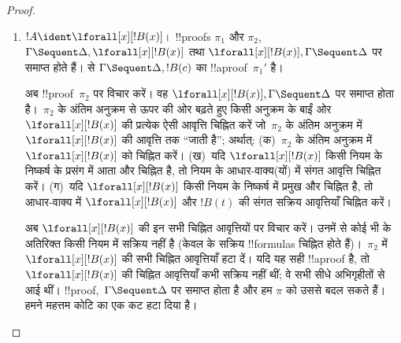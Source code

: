 \documentclass[../../../include/open-logic-section]{subfiles}
\begin{document}
\begin{proof}
\begin{enumerate}
  $\pi_2''$ पर  लगाकर $!C, !B, \Gamma
  \Sequent \Delta$ का !!a{proof}~$\pi_2'''$ भी मिलता है। !!{proof}~$\pi'$ है:
  \[
  \AxiomC{}
  \RightLabel{$\pi_2'$}
  \Deduce$\Gamma \fCenter \Delta, !B$
  \AxiomC{}
  \RightLabel{$\pi_1'$}
  \Deduce$!B, \Gamma \fCenter \Delta, !C$
  \AxiomC{}
  \RightLabel{$\pi_2'''$}
  \Deduce$!C, !B, \Gamma \fCenter \Delta$
  \RightLabel{\CutCS}
  \BinaryInf$!B, \Gamma \fCenter \Delta$
  \RightLabel{\CutCS}
  \BinaryInf$\Gamma \fCenter \Delta$
  \DisplayProof
  \]
  \item $!A \ident \lforall[x][!B(x)]$। !!{proof}s $\pi_1$ और $\pi_2$,
  $\Gamma \Sequent \Delta, \lforall[x][!B(x)]$ तथा $\lforall[x][!B(x)],
  \Gamma \Sequent \Delta$ पर समाप्त होते हैं।  से
  $\Gamma \Sequent \Delta, !B(c)$ का !!a{proof}~$\pi_1'$ है।

  अब !!{proof}~$\pi_2$ पर विचार करें। वह $\lforall[x][!B(x)], \Gamma
  \Sequent \Delta$ पर समाप्त होता है।~$\pi_2$ के अंतिम अनुक्रम से ऊपर की ओर
  बढ़ते हुए किसी अनुक्रम के बाईं ओर $\lforall[x][!B(x)]$ की प्रत्येक ऐसी
  आवृत्ति चिह्नित करें जो~$\pi_2$ के अंतिम अनुक्रम में $\lforall[x][!B(x)]$
  की आवृत्ति तक ``जाती है''; अर्थात्: (क)~$\pi_2$ के अंतिम अनुक्रम में
  $\lforall[x][!B(x)]$ को चिह्नित करें। (ख)~यदि $\lforall[x][!B(x)]$ किसी
  नियम के निष्कर्ष के प्रसंग में आता और चिह्नित है, तो नियम के आधार-वाक्य(यों)
  में संगत आवृत्ति चिह्नित करें। (ग)~यदि $\lforall[x][!B(x)]$ किसी
  \LeftR{\lforall} नियम के निष्कर्ष में प्रमुख और चिह्नित है, तो आधार-वाक्य में
  $\lforall[x][!B(x)]$ और $!B(t)$ की संगत सक्रिय आवृत्तियाँ चिह्नित करें।
  
  अब $\lforall[x][!B(x)]$ की इन सभी चिह्नित आवृत्तियों पर विचार करें। उनमें
  से कोई भी \LeftR{\lforall} के अतिरिक्त किसी नियम में सक्रिय नहीं है (केवल
  \LeftR{\lforall} के सक्रिय !!{formula}s चिह्नित होते हैं)।~$\pi_2$ में
  $\lforall[x][!B(x)]$ की सभी चिह्नित आवृत्तियाँ हटा दें। यदि यह सही !!a{proof}
  है, तो $\lforall[x][!B(x)]$ की चिह्नित आवृत्तियाँ कभी सक्रिय नहीं थीं; वे
  सभी सीधे अभिगृहीतों से आई थीं। !!{proof},~$\Gamma \Sequent \Delta$ पर समाप्त
  होता है और हम $\pi$ को उससे बदल सकते हैं। हमने महत्तम कोटि का एक कट हटा दिया
  है।


\end{enumerate}
\end{proof}
\end{document}
